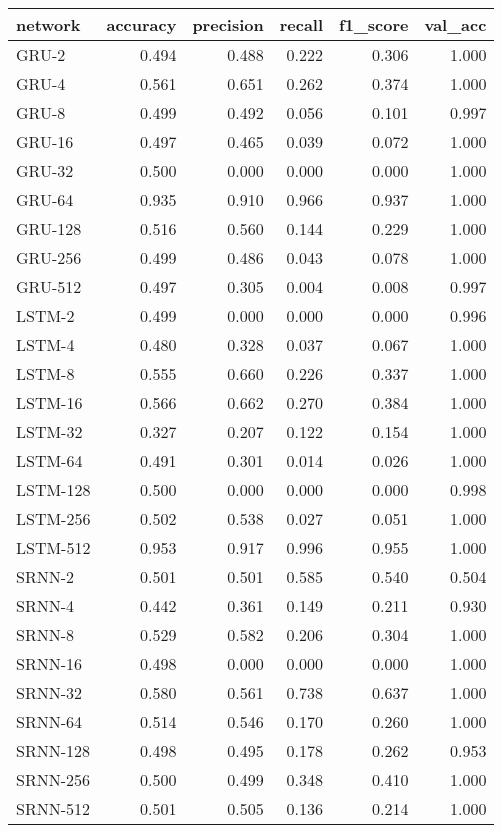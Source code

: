 \begin{tabular}{lrrrrr}
\toprule
  network &  accuracy &  precision &  recall &  f1\_score &  val\_acc \\
\midrule
    GRU-2 &     0.494 &      0.488 &   0.222 &     0.306 &    1.000 \\
    GRU-4 &     0.561 &      0.651 &   0.262 &     0.374 &    1.000 \\
    GRU-8 &     0.499 &      0.492 &   0.056 &     0.101 &    0.997 \\
   GRU-16 &     0.497 &      0.465 &   0.039 &     0.072 &    1.000 \\
   GRU-32 &     0.500 &      0.000 &   0.000 &     0.000 &    1.000 \\
   GRU-64 &     0.935 &      0.910 &   0.966 &     0.937 &    1.000 \\
  GRU-128 &     0.516 &      0.560 &   0.144 &     0.229 &    1.000 \\
  GRU-256 &     0.499 &      0.486 &   0.043 &     0.078 &    1.000 \\
  GRU-512 &     0.497 &      0.305 &   0.004 &     0.008 &    0.997 \\
   LSTM-2 &     0.499 &      0.000 &   0.000 &     0.000 &    0.996 \\
   LSTM-4 &     0.480 &      0.328 &   0.037 &     0.067 &    1.000 \\
   LSTM-8 &     0.555 &      0.660 &   0.226 &     0.337 &    1.000 \\
  LSTM-16 &     0.566 &      0.662 &   0.270 &     0.384 &    1.000 \\
  LSTM-32 &     0.327 &      0.207 &   0.122 &     0.154 &    1.000 \\
  LSTM-64 &     0.491 &      0.301 &   0.014 &     0.026 &    1.000 \\
 LSTM-128 &     0.500 &      0.000 &   0.000 &     0.000 &    0.998 \\
 LSTM-256 &     0.502 &      0.538 &   0.027 &     0.051 &    1.000 \\
 LSTM-512 &     0.953 &      0.917 &   0.996 &     0.955 &    1.000 \\
   SRNN-2 &     0.501 &      0.501 &   0.585 &     0.540 &    0.504 \\
   SRNN-4 &     0.442 &      0.361 &   0.149 &     0.211 &    0.930 \\
   SRNN-8 &     0.529 &      0.582 &   0.206 &     0.304 &    1.000 \\
  SRNN-16 &     0.498 &      0.000 &   0.000 &     0.000 &    1.000 \\
  SRNN-32 &     0.580 &      0.561 &   0.738 &     0.637 &    1.000 \\
  SRNN-64 &     0.514 &      0.546 &   0.170 &     0.260 &    1.000 \\
 SRNN-128 &     0.498 &      0.495 &   0.178 &     0.262 &    0.953 \\
 SRNN-256 &     0.500 &      0.499 &   0.348 &     0.410 &    1.000 \\
 SRNN-512 &     0.501 &      0.505 &   0.136 &     0.214 &    1.000 \\
\bottomrule
\end{tabular}
